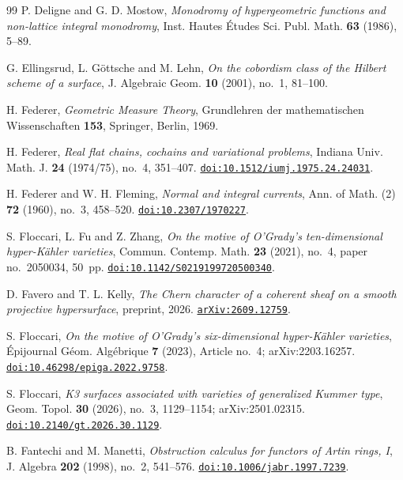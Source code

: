 \begin{thebibliography}{99}
P. Deligne and G. D. Mostow,
\emph{Monodromy of hypergeometric functions and non-lattice integral
monodromy},
Inst. Hautes \'Etudes Sci. Publ. Math. \textbf{63} (1986), 5--89.

G. Ellingsrud, L. G\"ottsche and M. Lehn,
\emph{On the cobordism class of the Hilbert scheme of a surface},
J. Algebraic Geom. \textbf{10} (2001), no.~1, 81--100.

H. Federer,
\emph{Geometric Measure Theory},
Grundlehren der mathematischen Wissenschaften \textbf{153},
Springer, Berlin, 1969.

H. Federer,
\emph{Real flat chains, cochains and variational problems},
Indiana Univ. Math. J. \textbf{24} (1974/75), no.~4, 351--407.
\href{https://doi.org/10.1512/iumj.1975.24.24031}{\texttt{doi:10.1512/iumj.1975.24.24031}}.

H. Federer and W. H. Fleming,
\emph{Normal and integral currents},
Ann. of Math. (2) \textbf{72} (1960), no.~3, 458--520.
\href{https://doi.org/10.2307/1970227}{\texttt{doi:10.2307/1970227}}.

S. Floccari, L. Fu and Z. Zhang,
\emph{On the motive of O'Grady's ten-dimensional hyper-K\"ahler varieties},
Commun. Contemp. Math. \textbf{23} (2021), no.~4, paper no.~2050034,
50~pp.
\href{https://doi.org/10.1142/S0219199720500340}{\texttt{doi:10.1142/S0219199720500340}}.

D. Favero and T. L. Kelly,
\emph{The Chern character of a coherent sheaf on a smooth projective
hypersurface},
preprint, 2026.
\href{https://arxiv.org/abs/2609.12759}{\texttt{arXiv:2609.12759}}.

S. Floccari,
\emph{On the motive of O'Grady's six-dimensional hyper-K\"ahler varieties},
\'Epijournal G\'eom. Alg\'ebrique \textbf{7} (2023), Article no.~4;
arXiv:2203.16257.
\href{https://doi.org/10.46298/epiga.2022.9758}{\texttt{doi:10.46298/epiga.2022.9758}}.

S. Floccari,
\emph{K3 surfaces associated with varieties of generalized Kummer type},
Geom. Topol. \textbf{30} (2026), no.~3, 1129--1154; arXiv:2501.02315.
\href{https://doi.org/10.2140/gt.2026.30.1129}{\texttt{doi:10.2140/gt.2026.30.1129}}.

B. Fantechi and M. Manetti,
\emph{Obstruction calculus for functors of Artin rings, I},
J. Algebra \textbf{202} (1998), no.~2, 541--576.
\href{https://doi.org/10.1006/jabr.1997.7239}{\texttt{doi:10.1006/jabr.1997.7239}}.


\end{thebibliography}
